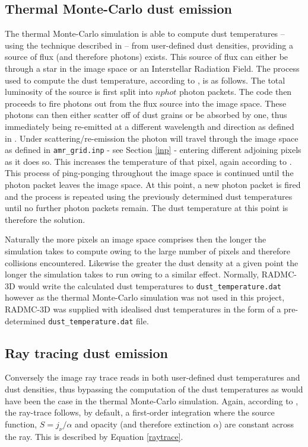 \documentclass{report}
\begin{document}
\subsection{Thermal Monte-Carlo dust emission}
The thermal Monte-Carlo simulation is able to compute dust temperatures – using the technique described in \textcite{b&w} – from user-defined dust densities, providing a source of flux (and therefore photons) exists. This source of flux can either be through a star in the image space or an Interstellar Radiation Field. The process used to compute the dust temperature, according to \textcite{manual}, is as follows. The total luminosity of the source is first split into $nphot$ photon packets. The code then proceeds to \textquotesingle fire \textquotesingle photons out from the flux source into the image space. These photons can then either scatter off of dust grains or be absorbed by one, thus immediately being re-emitted at a different wavelength and direction as defined in \textcite{b&w}. Under scattering/re-emission the photon will travel through the image space as defined in \texttt{amr\_grid.inp} - see Section \ref{inp} - entering different adjoining pixels as it does so. This increases the temperature of that pixel, again according to \textcite{b&w}. This process of \textquotesingle ping-ponging \textquotesingle throughout the image space is continued until the photon packet leaves the image space. At this point, a new photon packet is \textquotesingle fired \textquotesingle and the process is repeated using the previously determined dust temperatures until no further photon packets remain. The dust temperature at this point is therefore the solution.

Naturally the more pixels an image space comprises then the longer the simulation takes to compute owing to the large number of pixels and therefore collisions encountered. Likewise the greater the dust density at a given point the longer the simulation takes to run owing to a similar effect. Normally, RADMC-3D would write the calculated dust temperatures to \texttt{dust\_temperature.dat} however as the thermal Monte-Carlo simulation was not used in this project, RADMC-3D was supplied with idealised dust temperatures in the form of a pre-determined \texttt{dust\_temperature.dat} file.

\subsection{Ray tracing dust emission}
Conversely the image ray trace reads in both user-defined dust temperatures and dust densities, thus bypassing the computation of the dust temperatures as would have been the case in the thermal Monte-Carlo simulation. Again, according to \textcite{manual}, the ray-trace follows, by default, a first-order integration where the source function, $S = j_{\nu}/\alpha$ and opacity (and therefore extinction $\alpha$) are constant across the ray. This is described by Equation \ref{raytrace}.
\end{document}
